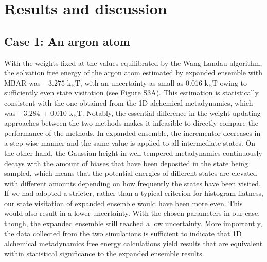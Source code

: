 \documentclass[journal=jacsat,manuscript=article]{achemso}
\begin{document}
\section{Results and discussion}
\subsection{Case 1: An argon atom}
With the weights fixed at the values equilibrated by the Wang-Landau algorithm, the solvation free energy of the argon atom estimated by expanded ensemble with MBAR was $-3.275$ $\text{k}_{\text{B}}\text{T}$, with an uncertainty as small as 0.016 $\text{k}_{\text{B}}\text{T}$ owing to sufficiently even state visitation (see Figure S3A). This estimation is statistically consistent with the one obtained from the 1D alchemical metadynamics, which was $-3.284$ $\pm$ 0.010 $\text{k}_{\text{B}}\text{T}$. Notably, the essential difference in the weight updating approaches between the two methods makes it infeasible to directly compare the performance of the methods. In expanded ensemble, the incrementor decreases in a step-wise manner and the same value is applied to all intermediate states. On the other hand, the Gaussian height in well-tempered metadynamics continuously decays with the amount of biases that have been deposited in the state being sampled, which means that the potential energies of different states are elevated with different amounts depending on how frequently the states have been visited. If we had adopted a stricter, rather than a typical criterion for histogram flatness, our state visitation of expanded ensemble would have been more even. This would also result in a lower uncertainty. With the chosen parameters in our case, though, the expanded ensemble still reached a low uncertainty. More importantly, the data collected from the two simulations is sufficient to indicate that 1D alchemical metadynamics free energy calculations yield results that are equivalent within statistical significance to the expanded ensemble results.
\end{document}
